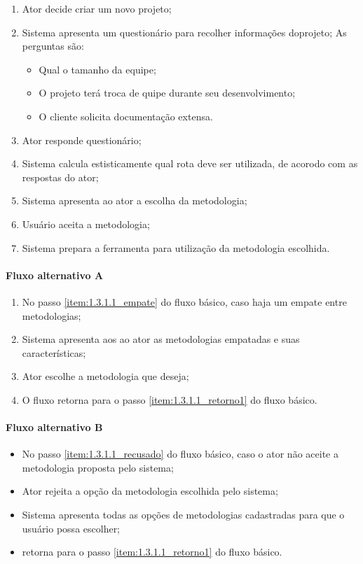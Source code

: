 	\begin{enumerate}
		\item Ator decide criar um novo projeto;
		\item Sistema apresenta um questionário para recolher informações doprojeto;
			As perguntas são:
			\begin{itemize}
				\item Qual o tamanho da equipe;
				\item O projeto terá troca de quipe durante seu desenvolvimento;
				\item O cliente solicita documentação extensa.
			\end{itemize}
		\item Ator responde questionário;
		\item Sistema calcula estisticamente qual rota deve ser utilizada, de acorodo com as respostas do ator;
			\label{item:1.3.1.1_empate}
		\item Sistema apresenta ao ator a escolha da metodologia;
		\item Usuário aceita a metodologia;
			\label{item:1.3.1.1_recusado}
		\item Sistema prepara a ferramenta para utilização da metodologia escolhida.
			\label{item:1.3.1.1_retorno1}
	\end{enumerate}

\paragraph{Fluxo alternativo A}

	\begin{enumerate}
		\item No passo \ref{item:1.3.1.1_empate} do fluxo básico, caso haja um empate entre metodologias;
		\item Sistema apresenta aos ao ator as metodologias empatadas e suas características;
		\item Ator escolhe a metodologia que deseja;
		\item O fluxo retorna para o passo \ref{item:1.3.1.1_retorno1} do fluxo básico.
	\end{enumerate}

\paragraph{Fluxo alternativo B}

	\begin{itemize}
		\item No passo \ref{item:1.3.1.1_recusado} do fluxo básico, caso o ator não aceite a metodologia proposta pelo sistema;
		\item Ator rejeita a opção da metodologia escolhida pelo sistema;
		\item Sistema apresenta todas as opções de metodologias cadastradas para que o usuário possa escolher;
		\item retorna para o passo \ref{item:1.3.1.1_retorno1} do fluxo básico.
	\end{itemize}	
	
